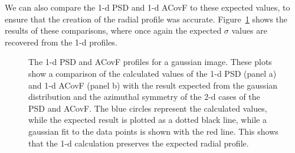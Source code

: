 \documentclass[11pt,preprint]{aastex}
\begin{document}
We can also compare the 1-d PSD and 1-d ACovF to these expected values, to ensure that the creation of the radial profile was accurate. Figure~\ref{fig:gauss_1d} shows the results of these comparisons, where once again the expected $\sigma$ values are recovered from the 1-d profiles. 

\begin{figure}[htb]
\centering
{}
\caption{{\small
The 1-d PSD and ACovF profiles for a gaussian image. These plots show a comparison of the calculated values of the 1-d PSD (panel a) and 1-d ACovF (panel b) with the result expected from the gaussian distribution and the azimuthal symmetry of the 2-d cases of the PSD and ACovF. The blue circles represent the calculated values, while the expected result is plotted as a dotted black line, while a gaussian fit to the data points is shown with the red line.  This shows that the 1-d calculation preserves the expected radial profile. }}
\label{fig:gauss_1d}
\end{figure}
\end{document}
